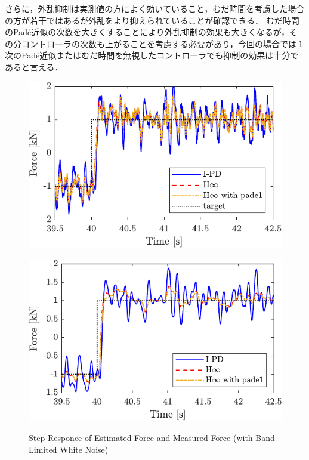 さらに，外乱抑制は実測値の方によく効いていること，むだ時間を考慮した場合の方が若干ではあるが外乱をより抑えられていることが確認できる．
むだ時間のPad\'e近似の次数を大きくすることにより外乱抑制の効果も大きくなるが，その分コントローラの次数も上がることを考慮する必要があり，今回の場合では１次のPad\'e近似またはむだ時間を無視したコントローラでも抑制の効果は十分であると言える．
\begin{figure}[t]
    \begin{minipage}{\minipageratio\hsize}
    \centering
        \includegraphics[keepaspectratio, scale = \minifigscale]{contents/ForceControl/figure/1115/crop-1115_diffnoise_estforce_step.pdf}
        \label{fig4:crop-1115_diffnoise_estforce_step}
    \end{minipage} 
    \begin{minipage}{\minipageratio\hsize}
    \centering
        \includegraphics[keepaspectratio, scale = \minifigscale]{contents/ForceControl/figure/1115/crop-1115_diffnoise_force_step.pdf}
        \label{fig4:crop-1115_diffnoise_force_step}
    \end{minipage}
    \caption{Step Responce of Estimated Force and Measured Force (with Band-Limited White Noise)}
    \label{fig4:crop-1115_diffnoise_step}
\end{figure}


